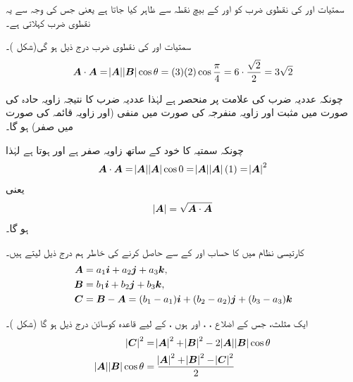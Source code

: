 سمتیات  اور  کی نقطوی ضرب کو  اور  کے بیچ نقطہ سے ظاہر کیا جاتا ہے یعنی  جس کی وجہ سے یہ نقطوی ضرب کہلاتی ہے۔

سمتیات  اور  کی نقطوی ضرب درج ذیل ہو گی(شکل )۔
\begin{align*}
{\ensuremath{{\boldsymbol{A}}}}\cdot{\ensuremath{{\boldsymbol{A}}}}=\abs{{{\boldsymbol{A}}}}\abs{{{\boldsymbol{B}}}}\cos\theta=(3)(2)\cos\frac{\pi}{4}=6\cdot\frac{\sqrt{2}}{2}=3\sqrt{2}
\end{align*}

چونکہ عددیہ ضرب کی علامت  پر منحصر ہے لہٰذا عددیہ ضرب کا نتیجہ زاویہ حادہ کی صورت میں مثبت  اور زاویہ منفرجہ کی صورت میں  منفی (اور زاویہ قائمہ کی صورت میں صفر) ہو گا۔

چونکہ سمتیہ  کا خود کے  ساتھ زاویہ صفر ہے  اور  ہوتا ہے لہٰذا
\begin{align*}
{\ensuremath{{\boldsymbol{A}}}}\cdot {\ensuremath{{\boldsymbol{A}}}}=\abs{{{\boldsymbol{A}}}}\abs{{{\boldsymbol{A}}}}\cos 0=\abs{{{\boldsymbol{A}}}}\abs{{{\boldsymbol{A}}}}(1)=\abs{{{\boldsymbol{A}}}}^2
\end{align*}
یعنی
\begin{align}
\abs{{{\boldsymbol{A}}}}=\sqrt{{{\boldsymbol{A}}}\cdot {\ensuremath{{\boldsymbol{A}}}}}
\end{align}
ہو گا۔

کارتیسی نظام میں  کا حساب  اور  کے   سے حاصل کرنے کی خاطر ہم درج ذیل لیتے ہیں۔
\begin{align*}
{\ensuremath{{\boldsymbol{A}}}}&=a_1{\boldsymbol{i}}+a_2{\boldsymbol{j}}+a_3{\boldsymbol{k}},\\
{{\boldsymbol{B}}}&=b_1{\boldsymbol{i}}+b_2{\boldsymbol{j}}+b_3{\boldsymbol{k}},\\
{{\boldsymbol{C}}}&={{\boldsymbol{B}}}-{{\boldsymbol{A}}}=(b_1-a_1){\boldsymbol{i}}+(b_2-a_2){\boldsymbol{j}}+(b_3-a_3){\boldsymbol{k}}
\end{align*}

ایک مثلث،  جس کے اضلاع ، ،  اور  ہوں ، کے لیے قاعدہ کوسائن درج ذیل ہو گا (شکل )۔
\begin{align*}
\abs{{{\boldsymbol{C}}}}^2&=\abs{{{\boldsymbol{A}}}}^2+\abs{{{\boldsymbol{B}}}}^2-2\abs{{{\boldsymbol{A}}}}\abs{{{\boldsymbol{B}}}}\cos\theta\\
\abs{{{\boldsymbol{A}}}}\abs{{{\boldsymbol{B}}}}\cos\theta&=\frac{\abs{{{\boldsymbol{A}}}}^2+\abs{{{\boldsymbol{B}}}}^2-\abs{{{\boldsymbol{C}}}}^2}{2}
\end{align*} 

